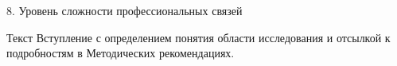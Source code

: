 \begin{frame}{8. Уровень сложности профессиональных связей}

Текст Вступление с определением понятия области исследования и отсылкой к подробностям в Методических рекомендациях.

\end{frame}


